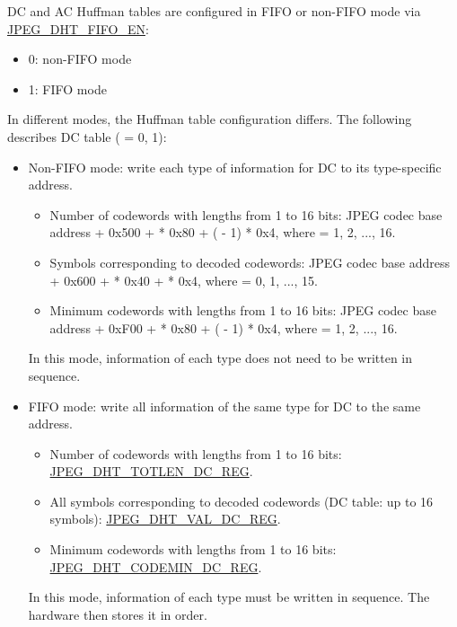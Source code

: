 \documentclass[main\_\_EN.tex]{subfiles}
\begin{document}
DC and AC Huffman tables are configured in FIFO or non-FIFO mode via \hyperref[fielddesc:JPEGDHTFIFOEN]{JPEG\_DHT\_FIFO\_EN}:
\begin{itemize}
    \item 0: non-FIFO mode
    \item 1: FIFO mode
\end{itemize}

In different modes, the Huffman table configuration differs. The following describes DC table  ( = 0, 1):
\begin{itemize}
    \item Non-FIFO mode: write each type of information for DC to its type-specific address.
    \begin{itemize}
        \item Number of codewords with lengths from 1 to 16 bits: JPEG codec base address + 0x500 +  * 0x80 + ( - 1) * 0x4, where  = 1, 2, ..., 16.
        \item Symbols corresponding to decoded codewords: JPEG codec base address + 0x600 +  * 0x40 +  * 0x4, where  = 0, 1, ..., 15.
        \item Minimum codewords with lengths from 1 to 16 bits: JPEG codec base address + 0xF00 +  * 0x80 + ( - 1) * 0x4, where  = 1, 2, ..., 16.
    \end{itemize}
    In this mode, information of each type does not need to be written in sequence.
    \item FIFO mode: write all information of the same type for DC to the same address.
    \begin{itemize}
        \item Number of codewords with lengths from 1 to 16 bits: \hyperref[regdesc:JPEGDHTTOTLENDC0REG]{JPEG\_DHT\_TOTLEN\_DC\_REG}.
        \item All symbols corresponding to decoded codewords (DC table: up to 16 symbols): \hyperref[regdesc:JPEGDHTVALDC0REG]{JPEG\_DHT\_VAL\_DC\_REG}.
        \item Minimum codewords with lengths from 1 to 16 bits: \hyperref[regdesc:JPEGDHTCODEMINDC0REG]{JPEG\_DHT\_CODEMIN\_DC\_REG}.
    \end{itemize}
    In this mode, information of each type must be written in sequence. The hardware then stores it in order.
\end{itemize}
\end{document}

